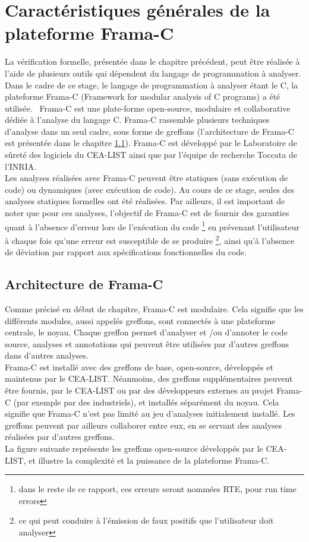 \section{Caractéristiques générales de la plateforme Frama-C}

La vérification formelle, présentée dans le chapitre précédent, peut être réalisée à l'aide de plusieurs outils qui dépendent du langage de programmation à analyser. Dans le cadre de ce stage, le langage de programmation à analyser étant le C, la plateforme Frama-C (Framework for modular analysis of C programs) a été utilisée.
\newline
\noindent
\ Frama-C est une plate-forme open-source, modulaire et collaborative dédiée à l'analyse du langage C. Frama-C rassemble plusieurs techniques d'analyse dans un seul cadre, sous forme de greffons (l'architecture de Frama-C est présentée dans le chapitre \ref{Architecture}). Frama-C est développé par le Laboratoire de sûreté des logiciels du CEA-LIST ainsi que par l'équipe de recherche Toccata de l'INRIA.
\\
\noindent Les analyses réalisées avec Frama-C peuvent être statiques (sans exécution de code) ou dynamiques (avec exécution de code). Au cours de ce stage, seules des analyses statiques formelles ont été réalisées. Par ailleurs, il est important de noter que pour ces analyses, l'objectif de Frama-C est de fournir des garanties quant à l'absence d'erreur lors de l'exécution du code \footnote{dans le reste de ce rapport, ces erreurs seront nommées RTE, pour run time errors} en prévenant l'utilisateur à chaque fois qu'une erreur est susceptible de se produire \footnote{ce qui peut conduire à l’émission de faux positifs que l'utilisateur doit analyser}, ainsi qu'à l'absence de déviation par rapport aux spécifications fonctionnelles du code.

\subsection{Architecture de Frama-C}\label{Architecture}

Comme précisé en début de chapitre, Frama-C est modulaire. Cela signifie que les différents modules, aussi appelés greffons, sont connectés à une plateforme centrale, le noyau. Chaque greffon permet d'analyser et /ou d'annoter le code source, analyses et annotations qui peuvent être utilisées par d'autres greffons dans d'autres analyses.
\\
\noindent
Frama-C est installé avec des greffons de base, open-source, développés et maintenus par le CEA-LIST. Néanmoins, des greffons supplémentaires peuvent être fournis, par le CEA-LIST ou par des développeurs externes au projet Frama-C (par exemple par des industriels), et installés séparément du noyau. Cela signifie que Frama-C n'est pas limité au jeu d'analyses initialement installé. Les greffons peuvent par ailleurs collaborer entre eux, en se servant des analyses réalisées par d'autres greffons.
\\
\noindent
La figure suivante représente les greffons open-source développés par le CEA-LIST, et illustre la complexité et la puissance de la plateforme Frama-C.

